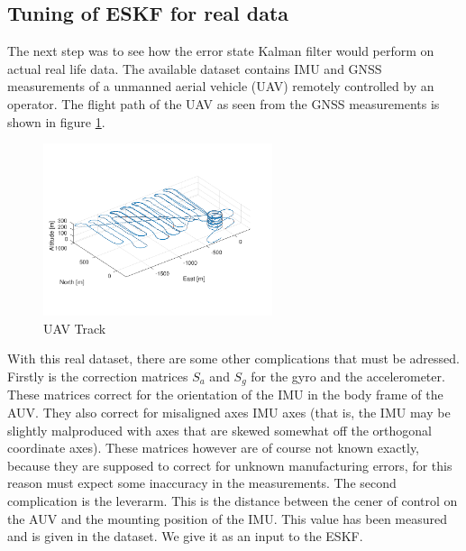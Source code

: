 \subsection{Tuning of ESKF for real data} \label{a2task3}
The next step was to see how the error state Kalman filter would perform on actual real life data. The available dataset contains IMU and GNSS measurements of a unmanned aerial vehicle (UAV) remotely controlled by an operator. The flight path of the UAV as seen from the GNSS measurements is shown in figure \ref{fig:real-track}.
\begin{figure}[H]
\centering
\includegraphics[width=0.6\textwidth]{plots/a2-real-track}
\caption{UAV Track}
\label{fig:real-track}
\end{figure}
With this real dataset, there are some other complications that must be adressed. Firstly is the correction matrices $S_a$ and $S_g$ for the gyro and the accelerometer. These matrices correct for the orientation of the IMU in the body frame of the AUV. They also correct for misaligned axes IMU axes (that is, the IMU may be slightly malproduced with axes that are skewed somewhat off the orthogonal coordinate axes). These matrices however are of course not known exactly, because they are supposed to correct for unknown manufacturing errors, for this reason must expect some inaccuracy in the measurements. The second complication is the leverarm. This is the distance between the cener of control on the AUV and the mounting position of the IMU. This value has been measured and is given in the dataset. We give it as an input to the ESKF.

